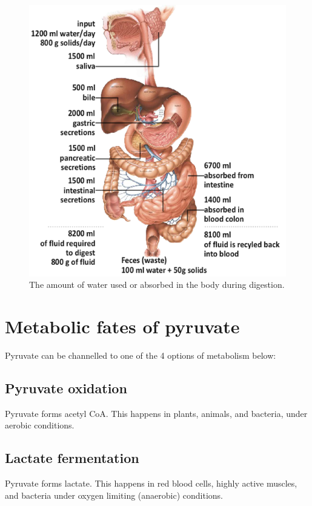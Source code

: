 \documentclass[11pt]{article}
\begin{document}
\begin{figure}[htbp]
\centering
\includegraphics[width=.9\linewidth]{./images/water-during-digestion.png}
\caption{The amount of water used or absorbed in the body during digestion.}
\end{figure}

\newpage

\section{Metabolic fates of pyruvate}
\label{sec:org78250e4}
Pyruvate can be channelled to one of the 4 options of metabolism below:

\subsection{Pyruvate oxidation}
\label{sec:org4b9336c}
Pyruvate forms acetyl CoA. This happens in plants, animals, and bacteria, under aerobic conditions.

\subsection{Lactate fermentation}
\label{sec:org7f44174}
Pyruvate forms lactate. This happens in red blood cells, highly active muscles, and bacteria under oxygen limiting (anaerobic) conditions.
\end{document}
